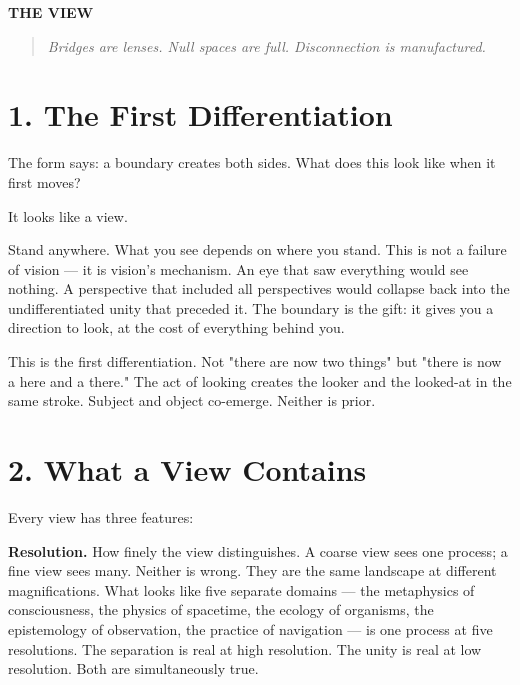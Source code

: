 \vspace{1cm}
\begin{center}
{\Large\sffamily\bfseries\color{headerblue} THE VIEW}
\end{center}
\vspace{0.5cm}


\begin{quote}
\itshape
\textit{Bridges are lenses. Null spaces are full. Disconnection is manufactured.}
\end{quote}


\bigskip\noindent\makebox[\textwidth]{\color{rulegray}\rule{5cm}{0.3pt}}\bigskip


\section*{1. The First Differentiation}


The form says: a boundary creates both sides. What does this look like when it first moves?


It looks like a view.


Stand anywhere. What you see depends on where you stand. This is not a failure of vision — it is vision's mechanism. An eye that saw everything would see nothing. A perspective that included all perspectives would collapse back into the undifferentiated unity that preceded it. The boundary is the gift: it gives you a direction to look, at the cost of everything behind you.


This is the first differentiation. Not "there are now two things" but "there is now a here and a there." The act of looking creates the looker and the looked-at in the same stroke. Subject and object co-emerge. Neither is prior.


\section*{2. What a View Contains}


Every view has three features:


\textbf{Resolution.} How finely the view distinguishes. A coarse view sees one process; a fine view sees many. Neither is wrong. They are the same landscape at different magnifications. What looks like five separate domains — the metaphysics of consciousness, the physics of spacetime, the ecology of organisms, the epistemology of observation, the practice of navigation — is one process at five resolutions. The separation is real at high resolution. The unity is real at low resolution. Both are simultaneously true.


